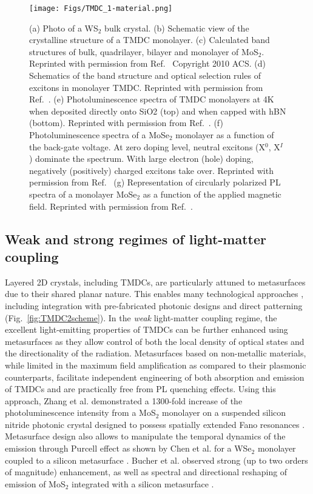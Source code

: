 \documentclass[journal=chreay,manuscript=review]{achemso}
\begin{document}
\begin{figure}
    \centering
    \texttt{[image: Figs/TMDC\_1-material.png]}
    \caption{
    (a) Photo of a WS$_2$ bulk crystal. (b) Schematic view of the crystalline structure of a TMDC monolayer. (c) Calculated band structures of bulk, quadrilayer, bilayer and monolayer of MoS$_2$. Reprinted with permission from Ref.~ Copyright 2010 ACS. (d) Schematics of the band structure and optical selection rules of excitons in monolayer TMDC. Reprinted with permission from Ref.~.  (e) Photoluminescence spectra of TMDC monolayers at 4K when deposited directly onto SiO2 (top) and when capped with hBN (bottom). Reprinted with permission from Ref.~. (f) Photoluminescence spectra of a MoSe$_2$ monolayer as a function of the back-gate voltage. At zero doping level, neutral excitons (X$^0$, X$^I$) dominate the spectrum. With large electron (hole) doping, negatively (positively) charged excitons take over. Reprinted with permission from Ref.~ (g) Representation of circularly polarized PL spectra of a monolayer MoSe$_2$ as a function of the applied magnetic field. Reprinted with permission from Ref.~.}
    \label{fig:TMDC1material}
\end{figure}

\subsection{Weak and strong regimes of light-matter coupling}

Layered 2D crystals, including TMDCs, are particularly attuned to metasurfaces due to their shared planar nature. This enables many technological approaches \cite{mupparapu2020integration}, including integration with pre-fabricated photonic designs and direct patterning (Fig.~\ref{fig:TMDC2scheme}). In the \textit{weak} light-matter coupling regime, the excellent light-emitting properties of TMDCs can be further enhanced using metasurfaces as they allow control of both the local density of optical states and the directionality of the radiation. Metasurfaces based on non-metallic materials, while limited in the maximum field amplification as compared to their plasmonic counterparts, facilitate independent engineering of both absorption and emission of TMDCs and are practically free from PL quenching effects. Using this approach, Zhang et al. demonstrated a 1300-fold increase of the photoluminescence intensity from a MoS$_2$ monolayer on a suspended silicon nitride photonic crystal designed to possess spatially extended Fano resonances \cite{zhang2017unidirectional}. Metasurface design also allows to manipulate the temporal dynamics of the emission through Purcell effect as shown by Chen et al. for a WSe$_2$ monolayer coupled to a silicon metasurface \cite{chen2017enhanced}. Bucher et al. observed strong (up to two orders of magnitude) enhancement, as well as spectral and directional reshaping of emission of MoS$_2$ integrated with a silicon metasurface \cite{bucher2019tailoring}.
\end{document}
